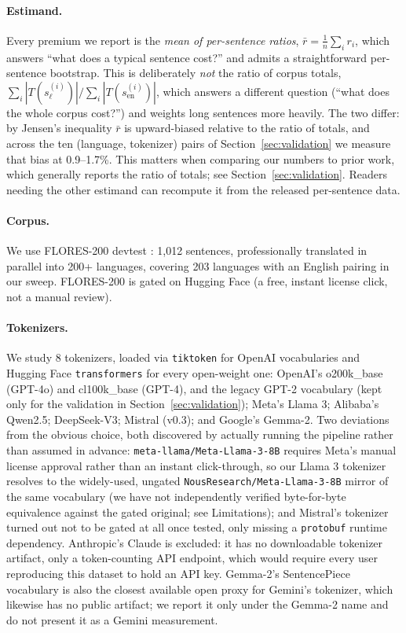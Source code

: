 \documentclass[11pt]{article}
\begin{document}
\paragraph{Estimand.} Every premium we report is the \emph{mean of
per-sentence ratios}, $\bar{r} = \frac{1}{n}\sum_i r_i$, which answers ``what
does a typical sentence cost?'' and admits a straightforward per-sentence
bootstrap. This is deliberately \emph{not} the ratio of corpus totals,
$\sum_i |T(s_\ell^{(i)})| \big/ \sum_i |T(s_{\mathrm{en}}^{(i)})|$, which
answers a different question (``what does the whole corpus cost?'') and
weights long sentences more heavily. The two differ: by Jensen's inequality
$\bar{r}$ is upward-biased relative to the ratio of totals, and across the
ten (language, tokenizer) pairs of Section~\ref{sec:validation} we measure
that bias at 0.9--1.7\%. This matters when comparing our numbers to prior
work, which generally reports the ratio of totals; see
Section~\ref{sec:validation}. Readers needing the other estimand can
recompute it from the released per-sentence data.

\paragraph{Corpus.} We use FLORES-200 devtest \citep{nllbteam2022}: 1{,}012
sentences, professionally translated in parallel into 200+ languages,
covering 203 languages with an English pairing in our sweep. FLORES-200 is
gated on Hugging Face (a free, instant license click, not a manual review).

\paragraph{Tokenizers.} We study 8 tokenizers, loaded via \texttt{tiktoken}
for OpenAI vocabularies and Hugging Face \texttt{transformers}
\citep{wolf2020transformers} for every open-weight one: OpenAI's
o200k\_base (GPT-4o) and cl100k\_base (GPT-4), and the legacy GPT-2
vocabulary (kept only for the validation in Section~\ref{sec:validation});
Meta's Llama 3; Alibaba's Qwen2.5; DeepSeek-V3; Mistral (v0.3); and
Google's Gemma-2. Two deviations
from the obvious choice, both discovered by actually running the pipeline
rather than assumed in advance: \texttt{meta-llama/Meta-Llama-3-8B} requires
Meta's manual license approval rather than an instant click-through, so our
Llama 3 tokenizer resolves to the widely-used, ungated
\texttt{NousResearch/Meta-Llama-3-8B} mirror of the same vocabulary (we have
not independently verified byte-for-byte equivalence against the gated
original; see Limitations); and Mistral's tokenizer turned out not to be
gated at all once tested, only
missing a \texttt{protobuf} runtime dependency. Anthropic's Claude is
excluded: it has no downloadable tokenizer artifact, only a token-counting
API endpoint, which would require every user reproducing this dataset to
hold an API key. Gemma-2's SentencePiece vocabulary is also the closest
available open proxy for Gemini's tokenizer, which likewise has no public
artifact; we report it only under the Gemma-2 name and do not present it as
a Gemini measurement.
\end{document}
